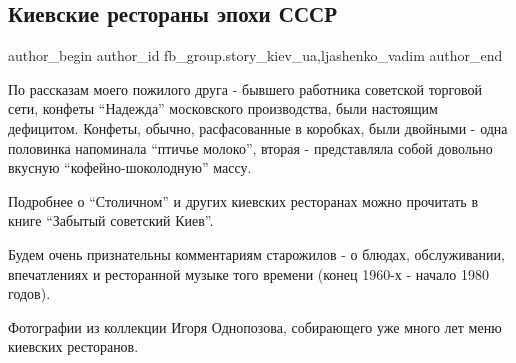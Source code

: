  
 
 
 
 
 
\subsection{Киевские рестораны эпохи СССР}
\label{sec:12_01_2022.fb.fb_group.story_kiev_ua.1.kiev_restorany_sssr}
 
\ifcmt
 author_begin
   author_id fb_group.story_kiev_ua,ljashenko_vadim
 author_end
\fi

По рассказам моего пожилого друга - бывшего работника советской торговой сети,
конфеты \enquote{Надежда} московского производства, были настоящим дефицитом. Конфеты,
обычно, расфасованные в коробках, были двойными - одна половинка напоминала
\enquote{птичье молоко}, вторая - представляла собой довольно вкусную
\enquote{кофейно-шоколодную} массу.


Подробнее о \enquote{Столичном} и других киевских ресторанах можно прочитать в книге
\enquote{Забытый советский Киев}.

Будем очень признательны комментариям старожилов - о блюдах, обслуживании,
впечатлениях и ресторанной музыке того времени (конец 1960-х - начало 1980
годов).

Фотографии из коллекции Игоря Однопозова, собирающего уже много лет меню
киевских ресторанов.

\raggedcolumns
\begin{multicols}{3} %
\setlength{\parindent}{0pt}






\end{multicols} %

